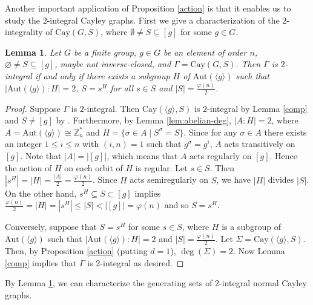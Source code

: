 \documentclass[12pt,a4paper]{article}
\newtheorem{lem}[thm]{Lemma}
\def \leq {\leqslant}
\begin{document}
	Another important application of Proposition \ref{action} is that it enables us to study the $2$-integral Cayley graphs.
	First we give a characterization of the $2$-integrality of $\mathrm{Cay}(G,S)$, where $\emptyset\neq S\subseteq [g]$ for some $g\in G$.
	\begin{lem}\label{half}
		Let $G$ be a finite  group, $g\in G$ be an element of order $n$, $\varnothing\neq S\subseteq [g]$, maybe not inverse-closed,  and $\Gamma=\mathrm{Cay}(G,S)$. 
		Then $\Gamma$ is $2$-integral if and only if there exists a subgroup $H$ of $\mathrm{Aut}(\langle g\rangle)$ such that $|\mathrm{Aut}(\langle g\rangle):H|=2$, $S=s^H$ for all $s\in S$ and $|S|=\frac{\varphi(n)}{2}$.
	\end{lem}
	\begin{proof}
		Suppose $\Gamma$ is $2$-integral. Then $\mathrm{Cay}(\langle g\rangle, S)$ is $2$-integral by Lemma \ref{comp} and $S\neq [g]$ by \cite[Corollay 7.2]{So}. 
		Furthermore, by Lemma \ref{lem:abelian-deg}, $|A:H|=2$, where $A=\mathrm{Aut}(\langle g\rangle)\cong\mathbb Z_n^*$ and $H=\{\sigma\in A\mid S^\sigma=S\}$.
		Since for any $\sigma\in A$ there exists an integer $1\leq i\leq n$ with $(i,n)=1$ such that $g^\sigma=g^i$, $A$ acts transitively on $[g]$. 
		Note that $|A|=|[g]|$, which means
		that $A$ acts regularly on $[g]$. Hence the action of $H$ on each orbit of $H$ is regular. Let $s\in S$. Then $|s^H|=|H|=\frac{|A|}{2}=\frac{\varphi(n)}{2}$. Since $H$ acts semiregularly on $S$, we have $|H|$ divides $|S|$. On the other hand, $s^H\subseteq S\subset [g]$ implies $\frac{\varphi(n)}{2}=|H|=|s^H|\leq |S|<|[g]|=\varphi(n)$ and so $S=s^H$.
		
		Conversely, suppose that $S=s^H$ for some $s\in S$, where $H$ is a subgroup of $\mathrm{Aut}(\langle g\rangle)$ such that $|\mathrm{Aut}(\langle g\rangle):H|=2$ and $|S|=\frac{\varphi(n)}{2}$. 
		Let $\Sigma=\mathrm{Cay}(\langle g\rangle, S)$. Then, by Proposition \ref{action} (putting $d=1$), $\deg(\Sigma)=2$. Now Lemma \ref{comp} implies that $\Gamma$ is $2$-integral as desired.
	\end{proof}
	
	By Lemma \ref{half}, we can characterize the generating sets of  $2$-integral normal Cayley graphs.
	
\end{document}
